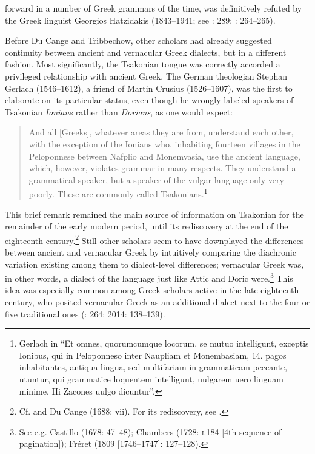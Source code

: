 forward in a number of Greek grammars of the time, was definitively refuted by the Greek linguist Georgios Hatzidakis (1843–1941; see \citealt{Argyropoulos2009}: 289; \citealt{Mackridge2009}: 264–265).

Before Du Cange and Tribbechow, other scholars had already suggested continuity between ancient and vernacular Greek dialects, but in a different fashion. Most significantly, the Tsakonian tongue was correctly accorded a privileged relationship with ancient Greek. The German theologian Stephan Gerlach (1546–1612), a friend of Martin Crusius (1526–1607), was the first to elaborate on its particular status, even though he wrongly labeled speakers of Tsakonian \textit{Ionians} rather than \textit{Dorians}, as one would expect:

\begin{quote}
And all [Greeks], whatever areas they are from, understand each other, with the exception of the Ionians who, inhabiting fourteen villages in the Peloponnese between Nafplio and Monemvasia, use the ancient language, which, however, violates grammar in many respects. They understand a grammatical speaker, but a speaker of the vulgar language only very poorly. These are commonly called Tsakonians.\footnote{Gerlach in \citet[489]{Crusius1584} “Et omnes, quorumcumque locorum, se mutuo intelligunt, exceptis Ionibus, qui in Peloponneso inter Naupliam et Monembasiam, 14. pagos inhabitantes, antiqua lingua, sed multifariam in grammaticam peccante, utuntur, qui grammatice loquentem intelligunt, uulgarem uero linguam minime. Hi Zacones uulgo dicuntur”.}
\end{quote}

This brief remark remained the main source of information on Tsakonian for the remainder of the early modern period, until its rediscovery at the end of the eighteenth century.\footnote{Cf. \citet[44]{Howell1650a} and Du Cange (1688: vii). For its rediscovery, see \citet{Famerie2007}.} Still other scholars seem to have downplayed the differences between ancient and vernacular Greek by intuitively comparing the diachronic variation existing among them to dialect-level differences; vernacular Greek was, in other words, a dialect of the language just like Attic and Doric were.\footnote{See e.g. Castillo (1678: 47–48); Chambers (1728: \textsc{i.}184 [4th sequence of pagination]); Fréret (1809 [1746–1747]: 127–128).} This idea was especially common among Greek scholars active in the late eighteenth century, who posited vernacular Greek as an additional dialect next to the four or five traditional ones (\citealt{Mackridge2009}: 264; 2014: 138–139).

